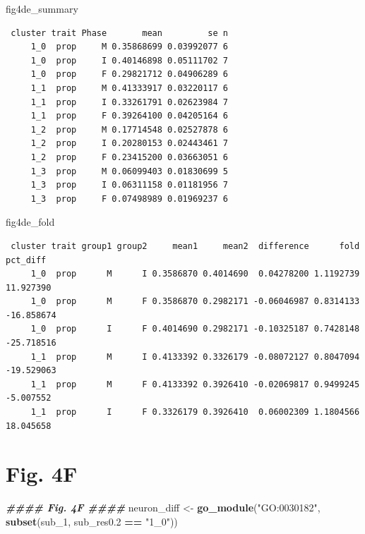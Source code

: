 \documentclass[
  landscape]{article}
\newenvironment{Shaded}{\begin{snugshade}}{\end{snugshade}}
\newcommand{\DocumentationTok}[1]{\textcolor[rgb]{0.56,0.35,0.01}{\textbf{\textit{#1}}}}
\newcommand{\FloatTok}[1]{\textcolor[rgb]{0.00,0.00,0.81}{#1}}
\newcommand{\FunctionTok}[1]{\textcolor[rgb]{0.13,0.29,0.53}{\textbf{#1}}}
\newcommand{\NormalTok}[1]{#1}
\newcommand{\OtherTok}[1]{\textcolor[rgb]{0.56,0.35,0.01}{#1}}
\newcommand{\SpecialCharTok}[1]{\textcolor[rgb]{0.81,0.36,0.00}{\textbf{#1}}}
\newcommand{\StringTok}[1]{\textcolor[rgb]{0.31,0.60,0.02}{#1}}
\begin{document}
\begin{Shaded}
\begin{Highlighting}[]
\NormalTok{fig4de\_summary}
\end{Highlighting}
\end{Shaded}

\begin{verbatim}
 cluster trait Phase       mean         se n
     1_0  prop     M 0.35868699 0.03992077 6
     1_0  prop     I 0.40146898 0.05111702 7
     1_0  prop     F 0.29821712 0.04906289 6
     1_1  prop     M 0.41333917 0.03220117 6
     1_1  prop     I 0.33261791 0.02623984 7
     1_1  prop     F 0.39264100 0.04205164 6
     1_2  prop     M 0.17714548 0.02527878 6
     1_2  prop     I 0.20280153 0.02443461 7
     1_2  prop     F 0.23415200 0.03663051 6
     1_3  prop     M 0.06099403 0.01830699 5
     1_3  prop     I 0.06311158 0.01181956 7
     1_3  prop     F 0.07498989 0.01969237 6
\end{verbatim}

\begin{Shaded}
\begin{Highlighting}[]
\NormalTok{fig4de\_fold}
\end{Highlighting}
\end{Shaded}

\begin{verbatim}
 cluster trait group1 group2     mean1     mean2  difference      fold   pct_diff
     1_0  prop      M      I 0.3586870 0.4014690  0.04278200 1.1192739  11.927390
     1_0  prop      M      F 0.3586870 0.2982171 -0.06046987 0.8314133 -16.858674
     1_0  prop      I      F 0.4014690 0.2982171 -0.10325187 0.7428148 -25.718516
     1_1  prop      M      I 0.4133392 0.3326179 -0.08072127 0.8047094 -19.529063
     1_1  prop      M      F 0.4133392 0.3926410 -0.02069817 0.9499245  -5.007552
     1_1  prop      I      F 0.3326179 0.3926410  0.06002309 1.1804566  18.045658
\end{verbatim}

\section{Fig. 4F}\label{fig.-4f}

\begin{Shaded}
\begin{Highlighting}[]
\DocumentationTok{\#\#\#\# Fig. 4F \#\#\#\#}
\NormalTok{neuron\_diff }\OtherTok{\textless{}{-}} \FunctionTok{go\_module}\NormalTok{(}\StringTok{"GO:0030182"}\NormalTok{, }\FunctionTok{subset}\NormalTok{(sub\_1, sub\_res0}\FloatTok{.2} \SpecialCharTok{==} \StringTok{"1\_0"}\NormalTok{))}
\end{Highlighting}
\end{Shaded}
\end{document}
